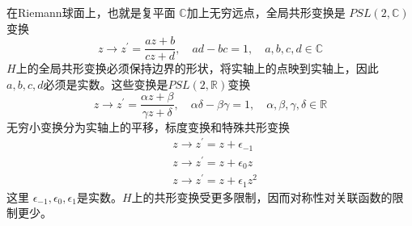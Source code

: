在Riemann球面上，也就是复平面 $\mathbb{C} $加上无穷远点，全局共形变换是 $PSL(2, \mathbb{C}) $变换
$$
z \rightarrow z^{\prime}=\frac{a z+b}{c z+d}, \quad a d-b c=1, \quad a, b, c, d \in \mathbb{C}
$$
$H $上的全局共形变换必须保持边界的形状，将实轴上的点映到实轴上，因此 $a,b,c,d $必须是实数。这些变换是$ PSL(2, \mathbb{R}) $变换
\begin{equation}
z \rightarrow z^{\prime}=\frac{\alpha z+\beta}{\gamma z+\delta}, \quad \alpha \delta-\beta \gamma=1, \quad \alpha, \beta, \gamma, \delta \in \mathbb{R}
\end{equation}
无穷小变换分为实轴上的平移，标度变换和特殊共形变换
\begin{align} &z \rightarrow z^{\prime}=z+\epsilon_{-1}\\ &z \rightarrow z^{\prime}=z+\epsilon_{0} z\\ &z \rightarrow z^{\prime}=z+\epsilon_{1} z^{2} \end{align}
这里 $\epsilon_{-1}, \epsilon_{0}, \epsilon_{1} $是实数。$ H $上的共形变换受更多限制，因而对称性对关联函数的限制更少。

